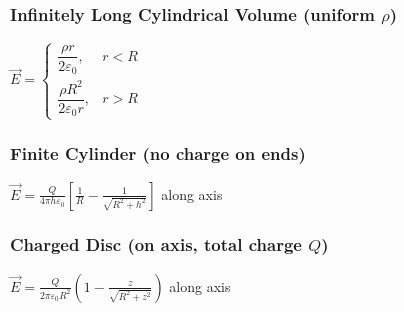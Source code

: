 \subsubsection*{Infinitely Long Cylindrical Volume (uniform $\rho$)}
$\vec{E} = 
\begin{cases}
\dfrac{\rho r}{2\varepsilon_0}, & r < R \\
\dfrac{\rho R^2}{2\varepsilon_0 r}, & r > R
\end{cases}$

\subsubsection*{Finite Cylinder (no charge on ends)}
$\vec{E} = \frac{Q}{4\pi h \varepsilon_0}\left[\frac{1}{R} - \frac{1}{\sqrt{R^2 + h^2}}\right]$ along axis

\subsubsection*{Charged Disc (on axis, total charge $Q$)}
$\vec{E} = \frac{Q}{2\pi\varepsilon_0 R^2}\left(1 - \frac{z}{\sqrt{R^2 + z^2}}\right)$ along axis
